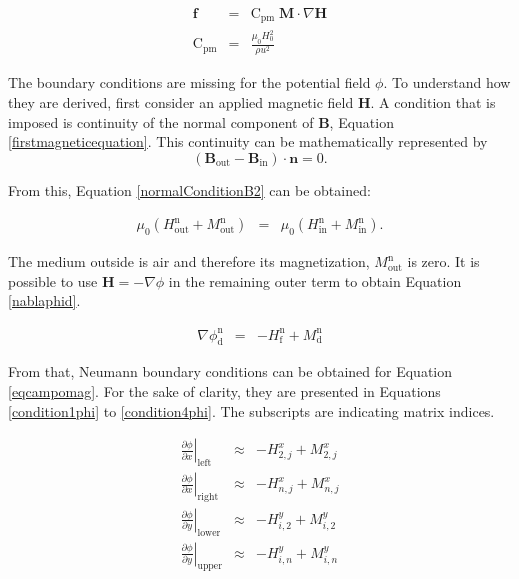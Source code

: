 \documentclass[journal]{IEEEtran}
\begin{document}
\begin{eqnarray}
\mathbf{f} & = & \mathrm{C}_{\mathrm{pm}}\; \mathbf{M}\cdot \nabla \mathbf{H}\label{magneticforce}\\
\mathrm{C}_{\mathrm{pm}} & = & \frac{\mu_0 H_0^2}{\rho u^2}\label{cpm}
\end{eqnarray}


The boundary conditions are missing for the potential field $\phi$. To understand how they are derived, first consider an applied magnetic field $\mathbf{H}$. A condition that is imposed is continuity of the normal component of $\mathbf{B}$, Equation \ref{firstmagneticequation}. This continuity can be mathematically represented by \begin{equation}\left(\mathbf{B}_{\mathrm{out}} - \mathbf{B}_{\mathrm{in}}\right)\cdot \mathbf{n} = 0 \label{normalconditionB}.\end{equation} 

From this, Equation \ref{normalConditionB2} can be obtained:

\begin{eqnarray}
\mu_0 (H_{\mathrm{out}}^{\mathrm{n}} + M_{\mathrm{out}}^{\mathrm{n}}) &=&  \mu_0(H_{\mathrm{in}}^{\mathrm{n}}+M_{\mathrm{in}}^{\mathrm{n}}).\label{normalConditionB2}
\end{eqnarray}

The medium outside is air and therefore its magnetization, $M_{\mathrm{out}}^{\mathrm{n}}$ is zero. It is possible to use $\mathbf{H} = -\nabla \phi$ in the remaining outer term to obtain Equation \ref{nablaphid}.

\begin{eqnarray}
\nabla\phi_{\mathrm{d}}^{\mathrm{n}} & = & -H_{\mathrm{f}}^{\mathrm{n}} + M_{\mathrm{d}}^{\mathrm{n}} \label{nablaphid}
\end{eqnarray}

From that, Neumann boundary conditions can be obtained for Equation \ref{eqcampomag}. For the sake of clarity, they are presented in Equations \ref{condition1phi} to \ref{condition4phi}. The subscripts are indicating matrix indices.

\begin{eqnarray}
\left.\frac{\partial \phi}{\partial x}\right|_{\mathrm{left}}\;\;&\approx&- H^{x}_{2,j} + M^{x}_{2,j}\label{condition1phi}\\
\left.\frac{\partial \phi}{\partial x}\right|_{\mathrm{right}}&\approx&- H^{x}_{n,j} + M^{x}_{n,j}\\
\left.\frac{\partial \phi}{\partial y}\right|_{\mathrm{lower}}&\approx&- H^{y}_{i,2} + M^{y}_{i,2}\\
\left.\frac{\partial \phi}{\partial y}\right|_{\mathrm{upper}}&\approx&- H^{y}_{i,n} + M^{y}_{i,n}\label{condition4phi}
\end{eqnarray}
\end{document}

